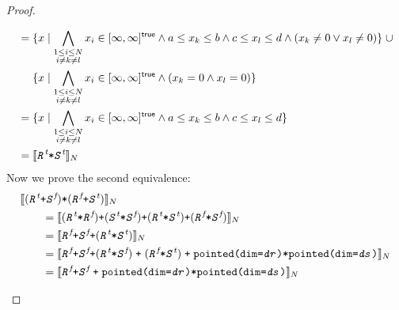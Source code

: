 \documentclass{article}
\theoremstyle{definition}
\theoremstyle{plain}
\theoremstyle{remark}
\newcommand{\interp}[1]{\llbracket{} {#1} \rrbracket{}}
\newcommand{\interv}[3]{\textnormal{$\lbrack#1,#2\rbrack^{#3}$}}
\newcommand{\textcap}[1]{\texttt{\textit{#1}}}
\begin{document}
\begin{proof}
\begin{description}
\begin{align*}
        & = \{ x \mid
            \bigwedge_{\substack{1 \leq i \leq N \\ i \neq k \neq l}} x_i \in
              \interv{\infty}{\infty}{\textsf{true}}
            \wedge a \leq x_k \leq b
          \wedge c \leq x_l \leq d \wedge {(x_k \neq 0 \vee x_l \neq 0)} \}
          \;\cup \\
        & \quad\,\, \{ x \mid
            \bigwedge_{\substack{1 \leq i \leq N \\ i \neq k \neq l}} x_i \in
              \interv{\infty}{\infty}{\textsf{true}}
            \wedge (x_k = 0 \wedge x_l = 0) \} \\
        & = \{ x \mid
            \bigwedge_{\substack{1 \leq i \leq N \\ i \neq k \neq l}} x_i \in
              \interv{\infty}{\infty}{\textsf{true}}
            \wedge a \leq x_k \leq b
            \wedge c \leq x_l \leq d \} \\
        & = \interp{\textcap{R}^{\textit{t}} \texttt{*} \textcap{S}^{\textit{t}}}_N
      \end{align*}
%
      Now we prove the second equivalence:
      \begin{align*}
        \hspace{2em}&\hspace{-2em} \interp{%
            (\textcap{R}^{\textit{t}} \texttt{+} \textcap{S}^{\textit{f}})
            \texttt{*}
            (\textcap{R}^{\textit{f}} \texttt{+} \textcap{S}^{\textit{t}})
          }_N \\
        &= \interp{%
             (\textcap{R}^{\textit{t}} \texttt{*} \textcap{R}^{\textit{f}})
             \texttt{+}
             (\textcap{S}^{\textit{t}} \texttt{*} \textcap{S}^{\textit{f}})
             \texttt{+}
             (\textcap{R}^{\textit{t}} \texttt{*} \textcap{S}^{\textit{t}})
             \texttt{+}
             (\textcap{R}^{\textit{f}} \texttt{*} \textcap{S}^{\textit{f}})
           }_N \\
        &= \interp{%
             \textcap{R}^{\textit{f}}
             \texttt{+}
             \textcap{S}^{\textit{f}}
             \texttt{+}
             (\textcap{R}^{\textit{t}} \texttt{*} \textcap{S}^{\textit{t}})
           }_N \\
        &= \interp
             {\textcap{R}^{\textit{f}}
              \texttt{+}
              \textcap{S}^{\textit{f}}
              \texttt{+}
              {(\textcap{R}^{\textit{t}} \texttt{*} \textcap{S}^{\textit{f}})}
               \;\texttt{+}\;
               {(\textcap{R}^{\textit{f}} \texttt{*} \textcap{S}^{\textit{t}})}
               \;\texttt{+}\;
               \texttt{pointed(dim=\textcap{dr})*pointed(dim=\textcap{ds})}}_N \\
        &= \interp{\textcap{R}^{\textit{f}} \texttt{+} \textcap{S}^{\textit{f}}
                   \;\texttt{+}\;
                   \texttt{pointed(dim=\textcap{dr})*pointed(dim=\textcap{ds})}}_N
      \end{align*}
  \end{description}
\end{proof}
\end{document}
